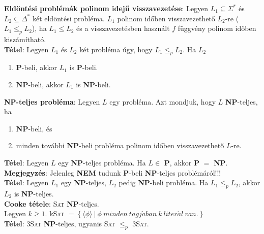 \documentclass[margin=0px]{article}
\begin{document}
\noindent \textbf{Eldöntési problémák polinom idejű visszavezetése}:
Legyen $L_{1} \subseteq \Sigma^{*}$ és $L_{2} \subseteq \Delta^{*}$	két eldöntési probléma.
$L_{1}$ polinom időben visszavezethető $L_{2}$-re ($L_{1} \leq_{p} L_{2}$), ha $L_{1} \leq L_{2}$ és
a visszavezetésben használt $f$ függvény polinom időben kiszámítható.\\

\noindent \textbf{Tétel}: Legyen $L_{1}$ és $L_{2}$ két probléma úgy, hogy $L_{1} \leq_{p} L_{2}$. Ha $L_{2}$

\begin{enumerate}
    \item	\textbf{P}-beli, akkor $L_{1}$ is \textbf{P}-beli.

    \item	\textbf{NP}-beli, akkor $L_{1}$ is \textbf{NP}-beli.
\end{enumerate}

\noindent \textbf{NP-teljes probléma}: Legyen $L$ egy probléma. Azt mondjuk, hogy $L$ \textbf{NP}-teljes, ha

\begin{enumerate}
    \item	\textbf{NP}-beli, és

    \item	minden további \textbf{NP}-beli probléma polinom időben visszavezethető $L$-re.

\end{enumerate}

\noindent \textbf{Tétel}: Legyen $L$ egy \textbf{NP}-teljes probléma. Ha $L \in$ \textbf{P}, akkor \textbf{P} $=$ \textbf{NP}.\\

\noindent \textbf{Megjegyzés}: Jelenleg \textbf{NEM} tudunk \textbf{P}-beli \textbf{NP}-teljes problémáról!!!\\

\noindent \textbf{Tétel}: Legyen $L_{1}$ egy \textbf{NP}-teljes, $L_{2}$ pedig \textbf{NP}-beli probléma.
Ha $L_{1} \leq_{p} L_{2}$, akkor $L_{2}$ is \textbf{NP}-teljes.\\

\noindent \textbf{Cooke tétele}: \textsc{Sat} \textbf{NP}-teljes.\\

\noindent Legyen $k \geq 1$.
k\textsc{Sat} $= \left\{\langle \phi \rangle \ | \ \phi \ minden \ tagj\acute{a}ban \ k \ liter\acute{a}l \ van. \right\}$\\

\noindent \textbf{Tétel}: 3\textsc{Sat} \textbf{NP}-teljes, ugyanis \textsc{Sat} $\leq_{p}$ 3\textsc{Sat}.\\
\end{document}
